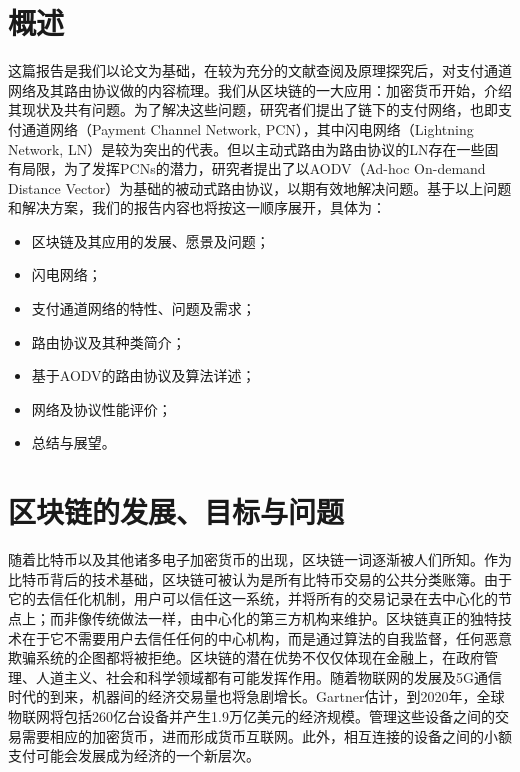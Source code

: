 \documentclass[12pt,a4paper]{article}
\begin{document}
\setlength{\parindent}{2em}



\tableofcontents
\clearpage

\section{概述}
这篇报告是我们以论文\cite{hoenisch2018aodv}为基础，在较为充分的文献查阅及原理探究后，对支付通道网络及其路由协议做的内容梳理。我们从区块链的一大应用：加密货币开始，介绍其现状及共有问题。为了解决这些问题，研究者们提出了链下的支付网络，也即支付通道网络（Payment Channel Network, PCN），其中闪电网络（Lightning Network, LN）是较为突出的代表。但以主动式路由为路由协议的LN存在一些固有局限，为了发挥PCNs的潜力，研究者提出了以AODV（Ad-hoc On-demand Distance Vector）为基础的被动式路由协议，以期有效地解决问题。基于以上问题和解决方案，我们的报告内容也将按这一顺序展开，具体为：
\begin{itemize}
	\item 区块链及其应用的发展、愿景及问题；
	\item 闪电网络；
	\item 支付通道网络的特性、问题及需求；
	\item 路由协议及其种类简介；
	\item 基于AODV的路由协议及算法详述；
	\item 网络及协议性能评价；
	\item 总结与展望。
\end{itemize}

\section{区块链的发展、目标与问题}
随着比特币\cite{nakamoto2008bitcoin}以及其他诸多电子加密货币的出现，区块链一词逐渐被人们所知。作为比特币背后的技术基础，区块链可被认为是所有比特币交易的公共分类账簿\cite{swan2015blockchain}。由于它的去信任化机制，用户可以信任这一系统，并将所有的交易记录在去中心化的节点上；而非像传统做法一样，由中心化的第三方机构来维护。区块链真正的独特技术在于它不需要用户去信任任何的中心机构，而是通过算法的自我监督，任何恶意欺骗系统的企图都将被拒绝。区块链的潜在优势不仅仅体现在金融上，在政府管理、人道主义、社会和科学领域都有可能发挥作用。随着物联网的发展及5G通信时代的到来，机器间的经济交易量也将急剧增长。Gartner\cite{iot_economic}估计，到2020年，全球物联网将包括260亿台设备并产生1.9万亿美元的经济规模。管理这些设备之间的交易需要相应的加密货币，进而形成货币互联网。此外，相互连接的设备之间的小额支付可能会发展成为经济的一个新层次\cite{new_layer_economy}。
\end{document}
